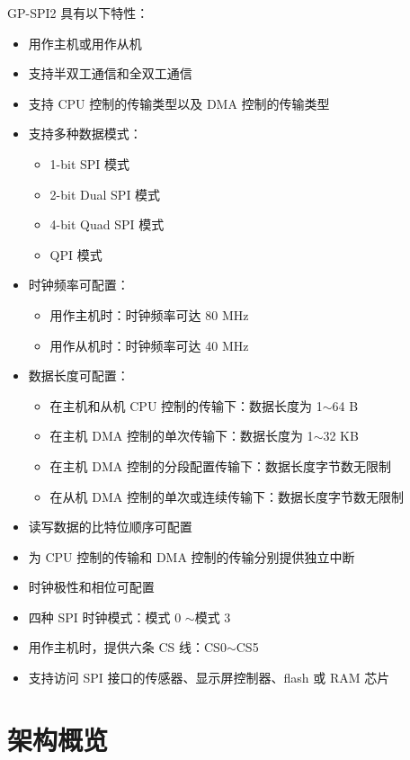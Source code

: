 \documentclass[main\_\_CN.tex]{subfiles}
\begin{document}
GP-SPI2 具有以下特性：
\begin{itemize}
    \item 用作主机或用作从机
    \item 支持半双工通信和全双工通信
    \item 支持 CPU 控制的传输类型以及 DMA 控制的传输类型
    \item 支持多种数据模式：
        \begin{itemize}
            \item 1-bit SPI 模式
            \item 2-bit Dual SPI 模式
            \item 4-bit Quad SPI 模式
            \item QPI 模式
        \end{itemize}
    \item 时钟频率可配置：
        \begin{itemize}
        \item 用作主机时：时钟频率可达 80 MHz
            \item 用作从机时：时钟频率可达 40 MHz
        \end{itemize}
    \item 数据长度可配置：
    \begin{itemize}
        \item 在主机和从机 CPU 控制的传输下：数据长度为 1$\sim$64 B
        \item 在主机 DMA 控制的单次传输下：数据长度为 1$\sim$32 KB
        \item 在主机 DMA 控制的分段配置传输下：数据长度字节数无限制
        \item 在从机 DMA 控制的单次或连续传输下：数据长度字节数无限制
    \end{itemize}
    \item 读写数据的比特位顺序可配置
    \item 为 CPU 控制的传输和 DMA 控制的传输分别提供独立中断
    \item 时钟极性和相位可配置
    \item 四种 SPI 时钟模式：模式 0 $\sim$模式 3
    \item 用作主机时，提供六条 CS 线：CS0$\sim$CS5
    \item 支持访问 SPI 接口的传感器、显示屏控制器、flash 或 RAM 芯片
\end{itemize}

\section{架构概览}
\end{document}
